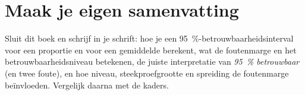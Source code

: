 
\begin{oefeningen}

\end{oefeningen}


\begin{oefeningen}






\end{oefeningen}


\ifzelfstudie
\section*{Maak je eigen samenvatting}
Sluit dit boek en schrijf in je schrift: hoe je een 95~\%-betrouwbaarheidsinterval voor een proportie en voor een gemiddelde berekent, wat de foutenmarge en het betrouwbaarheidsniveau betekenen, de juiste interpretatie van \textit{95~\% betrouwbaar} (en twee foute), en hoe niveau, steekproefgrootte en spreiding de foutenmarge beïnvloeden. Vergelijk daarna met de kaders.
\fi
